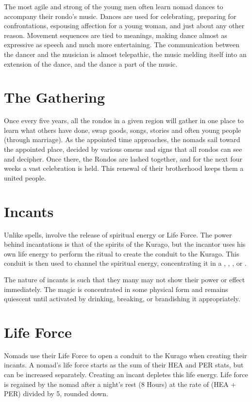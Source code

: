 The most agile and strong of the young men often learn nomad dances to accompany their rondo's music. Dances are used for celebrating, preparing for confrontations, espousing affection for a young woman, and just about any other reason. Movement sequences are tied to meanings, making dance almost as expressive as speech and much more entertaining. The communication between the dancer and the musician is almost telepathic, the music melding itself into an extension of the dance, and the dance a part of the music.

\section{The Gathering}

Once every five years, all the rondos in a given region will gather in one place to learn what others have done, swap goods, songs, stories and often young people
(through marriage). As the appointed time approaches, the nomads sail toward the appointed place, decided by various omens and signs that all rondos can see and decipher. Once there, the Rondos are lashed together, and for the next four weeks a vast celebration is held. This renewal of their brotherhood keeps them a united people.

\section{Incants}
Unlike spells,  involve the release of spiritual energy or Life Force. The power behind incantations is that of the spirits of the Kurago, but the incantor uses his own life energy to perform the ritual to create the conduit to the Kurago. This conduit is then used to channel the spiritual energy, concentrating it in a , , ,  or . 

The nature of incants is such that they many may not show their power or effect immediately. The magic is concentrated in some physical form and remains quiescent until activated by drinking, breaking, or brandishing it appropriately.

\section{Life Force}

Nomads use their Life Force to open a conduit to the Kurago when creating their incants. A nomad's life force starts as the sum of their HEA and PER stats, but can be increased separately. Creating an incant depletes this life energy. Life force is regained by the nomad after a night's rest (8 Hours) at the rate of (HEA + PER) divided by 5, rounded down.

